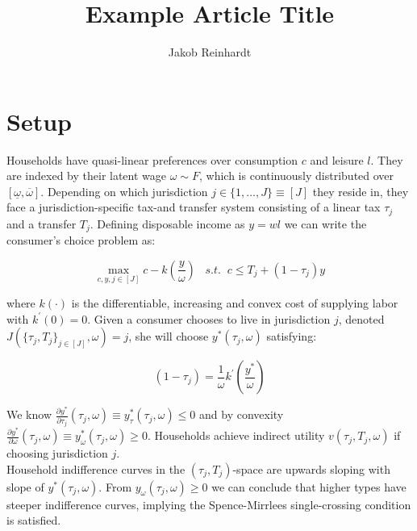 \documentclass[fleqn,10pt]{olplainarticle}
\title{Example Article Title}
\author[1]{Jakob Reinhardt}
\affil[1]{Yale University}
\begin{document}
\setlength{\parindent}{0pt}
\flushbottom
\thispagestyle{empty}

\section*{Setup}

Households have quasi-linear preferences over consumption $c$ and leisure $l$. They are indexed by their latent wage $\omega \sim F$, which is continuously distributed over $\left[\underline{\omega}, \overline{\omega}\right]$. Depending on which jurisdiction $j \in \{1, \ldots, J\} \equiv \left[J\right]$ they reside in, they face a jurisdiction-specific tax-and transfer system consisting of a linear tax $\tau_j$ and a transfer $T_j$. Defining disposable income as $y = wl$ we can write the consumer's choice problem as:

$$\max_{c, y, j \in \left[ J\right]} c - k(\frac{y}{\omega}) \;\;\;s.t. \;\; c \leq T_j + (1-\tau_j)y$$

where $k(\cdot)$ is the differentiable, increasing and convex cost of supplying labor with $k^\prime(0) = 0$. Given a consumer chooses to live in jurisdiction $j$, denoted $J(\{\tau_j, T_j\}_{j \in \left[J\right]}, \omega) = j$, she will choose $y^*(\tau_j, \omega)$ satisfying: 

$$(1-\tau_j) = \frac{1}{\omega}k^\prime(\frac{y^*}{\omega})$$

We know $\frac{\partial y^*}{\partial \tau_j}(\tau_j, \omega) \equiv y^*_\tau(\tau_j, \omega) \leq 0$ and by convexity $\frac{\partial y^*}{\partial \omega}(\tau_j, \omega) \equiv y^*_\omega(\tau_j, \omega) \geq 0$. Households achieve indirect utility $v(\tau_j, T_j, \omega)$ if choosing jurisdiction $j$.\\
Household indifference curves in the $(\tau_j, T_j)$-space are upwards sloping with slope of $y^*(\tau_j, \omega)$. From $y_\omega(\tau_j, \omega) \geq 0$ we can conclude that higher types have steeper indifference curves, implying the Spence-Mirrlees single-crossing condition is satisfied. 
\end{document}
